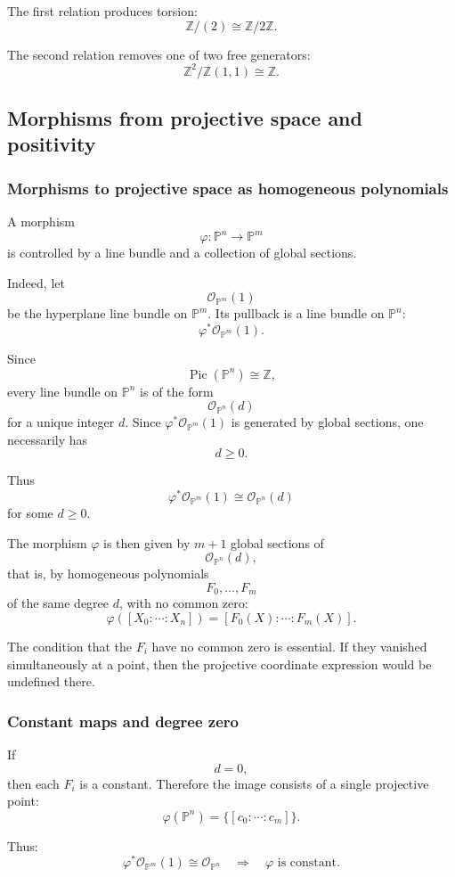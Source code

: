 \documentclass[12pt,a4paper]{article}
\newcommand{\OO}{\mathcal{O}}
\newcommand{\Pic}{\operatorname{Pic}}
\newcommand{\Z}{\mathbb{Z}}
\providecommand{\Pj}{\mathbb P}
\theoremstyle{notespace}
\begin{document}
The first relation produces torsion:
\[
\Z/(2)\cong \Z/2\Z.
\]

The second relation removes one of two free generators:
\[
\Z^2/\Z(1,1)\cong \Z.
\]

\subsection{Morphisms from projective space and positivity}

\subsubsection{Morphisms to projective space as homogeneous polynomials}

A morphism
\[
\varphi:\Pj^n\longrightarrow\Pj^m
\]
is controlled by a line bundle and a collection of global sections.

Indeed, let
\[
\OO_{\Pj^m}(1)
\]
be the hyperplane line bundle on \(\Pj^m\). Its pullback is a line bundle on \(\Pj^n\):
\[
\varphi^*\OO_{\Pj^m}(1).
\]

Since
\[
\Pic(\Pj^n)\cong\Z,
\]
every line bundle on \(\Pj^n\) is of the form
\[
\OO_{\Pj^n}(d)
\]
for a unique integer \(d\). Since \(\varphi^*\OO_{\Pj^m}(1)\) is generated by global sections, one necessarily has
\[
d\geq 0.
\]

Thus
\[
\varphi^*\OO_{\Pj^m}(1)\cong \OO_{\Pj^n}(d)
\]
for some \(d\geq 0\).

The morphism \(\varphi\) is then given by \(m+1\) global sections of
\[
\OO_{\Pj^n}(d),
\]
that is, by homogeneous polynomials
\[
F_0,\dots,F_m
\]
of the same degree \(d\), with no common zero:
\[
\varphi([X_0:\cdots:X_n])
=
[F_0(X):\cdots:F_m(X)].
\]

The condition that the \(F_i\) have no common zero is essential. If they vanished simultaneously at a point, then the projective coordinate expression would be undefined there.

\subsubsection{Constant maps and degree zero}

If
\[
d=0,
\]
then each \(F_i\) is a constant. Therefore the image consists of a single projective point:
\[
\varphi(\Pj^n)=\{[c_0:\cdots:c_m]\}.
\]

Thus:
\[
\boxed{
	\varphi^*\OO_{\Pj^m}(1)\cong \OO_{\Pj^n}
	\quad\Longrightarrow\quad
	\varphi\text{ is constant.}
}
\]
\end{document}
